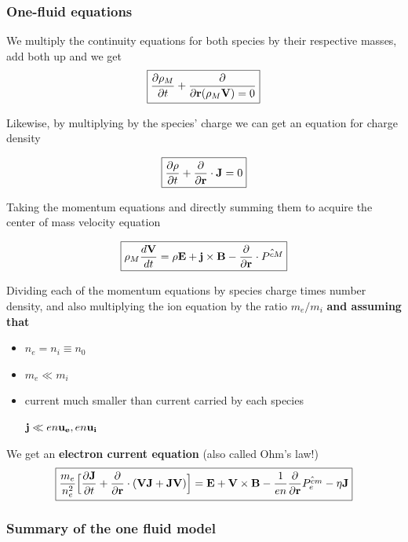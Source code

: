 \documentclass[PlasmaNotes.tex]{subfiles}
\begin{document}
\subsubsection{One-fluid equations}

We multiply the continuity equations for both species by their respective masses, add both up and we get
\begin{equation}
\boxed{ \frac{\partial \rho_M}{\partial t} + \frac{\partial }{\partial \mathbf{r} (\rho_M \mathbf{V}) = 0 } }
\end{equation}

Likewise, by multiplying by the species' charge we can get an equation for charge density

\begin{equation}
\boxed{ \frac{\partial \rho}{\partial t} + \frac{\partial }{\partial \mathbf{r}} \cdot \mathbf{J} = 0 }
\end{equation}

Taking the momentum equations and directly summing them to acquire the center of mass velocity equation

\begin{equation}
\boxed{ \rho_M \frac{d \mathbf{V}}{d t} = \rho \mathbf{E} + \mathbf{j} \times \mathbf{B} - \frac{\partial }{\partial \mathbf{r}} \cdot \hat{P^{cM}} }
\end{equation}

Dividing each of the momentum equations by species charge times number density, and also multiplying the ion equation by the ratio $m_e/m_i$ \textbf{and assuming that}
\begin{itemize}
\item $n_e = n_i \equiv n_0$
\item $m_e \ll m_i$
\item current much smaller than current carried by each species

$\mathbf{j} \ll e n \mathbf{u_e}, e n \mathbf{u_i} $
\end{itemize}

We get an \textbf{electron current equation} (also called Ohm's law!)
\begin{equation}
\boxed{ \frac{m_e}{n_e^2} \Big[ \frac{\partial \mathbf{J}}{\partial t} + \frac{\partial }{\partial \mathbf{r}} \cdot ( \mathbf{V} \mathbf{J} + \mathbf{J} \mathbf{V}) \Big] = \mathbf{E} + \mathbf{V} \times \mathbf{B} - \frac{1}{e n} \frac{\partial }{\partial \mathbf{r}} \hat{P_e^{cm}} - \eta \mathbf{J} }
\end{equation}

\subsubsection{Summary of the one fluid model}
\end{document}

